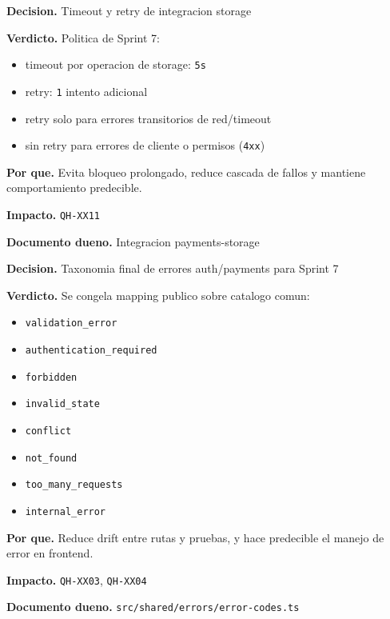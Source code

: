 \begin{docnote}
\textbf{Decision.} Timeout y retry de integracion storage

\textbf{Verdicto.} Politica de Sprint 7:
\begin{itemize}
  \item timeout por operacion de storage: \texttt{5s}
  \item retry: \texttt{1} intento adicional
  \item retry solo para errores transitorios de red/timeout
  \item sin retry para errores de cliente o permisos (\texttt{4xx})
\end{itemize}

\textbf{Por que.} Evita bloqueo prolongado, reduce cascada de fallos y mantiene comportamiento predecible.

\textbf{Impacto.} \texttt{QH-XX11}

\textbf{Documento dueno.} Integracion payments-storage
\end{docnote}

\begin{docnote}
\textbf{Decision.} Taxonomia final de errores auth/payments para Sprint 7

\textbf{Verdicto.} Se congela mapping publico sobre catalogo comun:
\begin{itemize}
  \item \texttt{validation\_error}
  \item \texttt{authentication\_required}
  \item \texttt{forbidden}
  \item \texttt{invalid\_state}
  \item \texttt{conflict}
  \item \texttt{not\_found}
  \item \texttt{too\_many\_requests}
  \item \texttt{internal\_error}
\end{itemize}

\textbf{Por que.} Reduce drift entre rutas y pruebas, y hace predecible el manejo de error en frontend.

\textbf{Impacto.} \texttt{QH-XX03}, \texttt{QH-XX04}

\textbf{Documento dueno.} \texttt{src/shared/errors/error-codes.ts}
\end{docnote}

